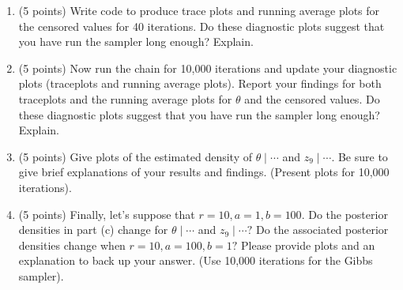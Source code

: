 \documentclass[
]{article}
\begin{document}
\begin{enumerate}
\def\labelenumi{\arabic{enumi}.}
\item
  (5 points) Write code to produce trace plots and running average plots
  for the censored values for 40 iterations. Do these diagnostic plots
  suggest that you have run the sampler long enough? Explain.
\item
  (5 points) Now run the chain for 10,000 iterations and update your
  diagnostic plots (traceplots and running average plots). Report your
  findings for both traceplots and the running average plots for
  \(\theta\) and the censored values. Do these diagnostic plots suggest
  that you have run the sampler long enough? Explain.
\item
  (5 points) Give plots of the estimated density of
  \(\theta \mid \cdots\) and \(z_9 \mid \cdots\). Be sure to give brief
  explanations of your results and findings. (Present plots for 10,000
  iterations).
\item
  (5 points) Finally, let's suppose that \(r=10,a=1,b=100.\) Do the
  posterior densities in part (c) change for \(\theta \mid \cdots\) and
  \(z_9 \mid \cdots?\) Do the associated posterior densities change when
  \(r=10, a=100,b=1?\) Please provide plots and an explanation to back
  up your answer. (Use 10,000 iterations for the Gibbs sampler).
\end{enumerate}
\end{document}
